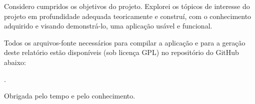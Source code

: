 
Considero cumpridos os objetivos do projeto. Explorei os tópicos de interesse do projeto em profundidade adequada teoricamente e construí, com o conhecimento adquirido e visando demonstrá-lo, uma aplicação usável e funcional.

Todos os arquivos-fonte necessários para compilar a aplicação e para a geração deste relatório estão disponíveis (sob licença GPL) no repositório do GitHub abaixo:

.

Obrigada pelo tempo e pelo conhecimento.